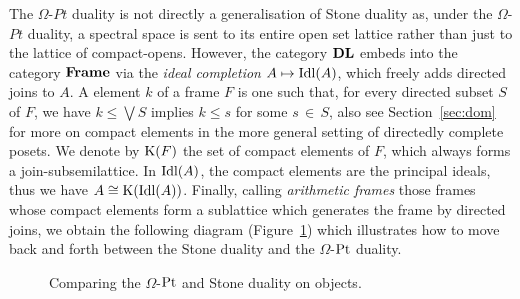 The $\Omega$-$Pt$ duality is not directly a generalisation of Stone duality as, under the $\Omega$-$Pt$ duality, a spectral space is sent to its entire open set lattice rather than just to the lattice of compact-opens. However, the category $\mathbf{DL}$ embeds into the category $\mathbf{Frame}$ via the \emph{ideal completion} $A\mapsto \mathrm{Idl}(A)$, which freely adds directed joins to $A$. A  element $k$ of a frame $F$ is one such that, for every directed subset $S$ of $F$, we have $k\leq\bigvee S$ implies $k\leq s$ for some $s\,{\in}\, S$, also see Section~\ref{sec:dom} for more on compact elements in the more general setting of directedly complete posets. We denote by $\mathrm{K}(F)$ the set of compact elements of $F$, which always forms a join-subsemilattice. In $\mathrm{Idl}(A)$, the compact elements are the principal ideals, thus we have $A\cong \mathrm{K}(\mathrm{Idl}(A))$. Finally, calling \emph{arithmetic frames} those frames whose compact elements form a sublattice which generates the frame by directed joins, we obtain the following diagram (Figure~\ref{fig:stone-omega-pt-objects}) which illustrates how to move back and forth between the Stone duality and the $\Omega$-$\mathrm{Pt}$ duality.
\begin{figure}[htp]
  \begin{center}
\end{center}
\caption{Comparing the $\Omega$-$\mathrm{Pt}$ and Stone duality on objects.}
\label{fig:stone-omega-pt-objects}
\end{figure}


